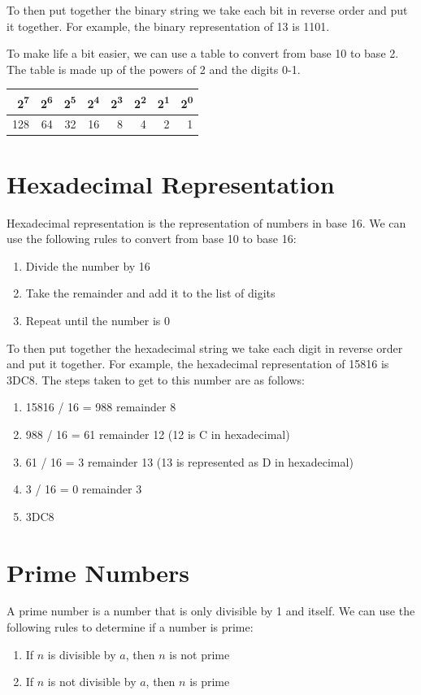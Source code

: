 \documentclass[11pt]{article}
\begin{document}
To then put together the binary string we take each bit in reverse order and put it together. For example, the binary representation of 13 is 1101.

To make life a bit easier, we can use a table to convert from base 10 to base 2. The table is made up of the powers of 2 and the digits 0-1.
\begin{center}
\begin{tabular}{rrrrrrrr}
2\textsuperscript{7} & 2\textsuperscript{6} & 2\textsuperscript{5} & 2\textsuperscript{4} & 2\textsuperscript{3} & 2\textsuperscript{2} & 2\textsuperscript{1} & 2\textsuperscript{0}\\
\hline
128 & 64 & 32 & 16 & 8 & 4 & 2 & 1\\
\end{tabular}
\end{center}

\section{Hexadecimal Representation}
\label{sec:orgf905e86}
Hexadecimal representation is the representation of numbers in base 16. We can use the following rules to convert from base 10 to base 16:
\begin{enumerate}
\item Divide the number by 16
\item Take the remainder and add it to the list of digits
\item Repeat until the number is 0
\end{enumerate}

To then put together the hexadecimal string we take each digit in reverse order and put it together. For example, the hexadecimal representation of 15816 is 3DC8. The steps taken to get to this number are as follows:
\begin{enumerate}
\item 15816 / 16 = 988 remainder 8
\item 988 / 16 = 61 remainder 12 (12 is C in hexadecimal)
\item 61 / 16 = 3 remainder 13 (13 is represented as D in hexadecimal)
\item 3 / 16 = 0 remainder 3
\item 3DC8
\end{enumerate}

\section{Prime Numbers}
\label{sec:org1cf4f80}
A prime number is a number that is only divisible by 1 and itself. We can use the following rules to determine if a number is prime:
\begin{enumerate}
\item If \(n\) is divisible by \(a\), then \(n\) is not prime
\item If \(n\) is not divisible by \(a\), then \(n\) is prime
\end{enumerate}
\end{document}
